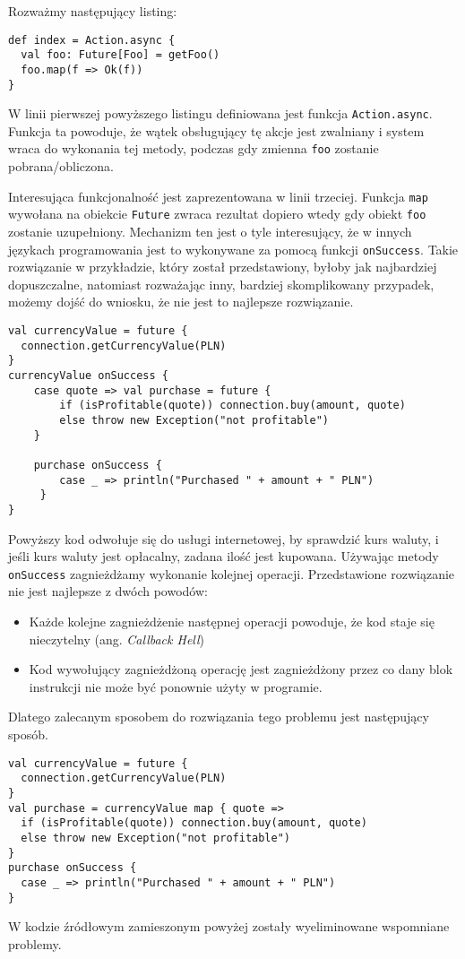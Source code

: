 Rozważmy następujący listing:

\begin{lstlisting}
def index = Action.async {
  val foo: Future[Foo] = getFoo()
  foo.map(f => Ok(f))
}
\end{lstlisting}

\par

W linii pierwszej powyższego listingu definiowana jest funkcja \lstinline{Action.async}. Funkcja ta powoduje, że wątek obsługujący tę akcje jest zwalniany i system wraca do wykonania tej metody, podczas gdy zmienna \lstinline{foo} zostanie pobrana/obliczona.

\par
Interesująca funkcjonalność jest zaprezentowana w linii trzeciej. Funkcja \lstinline{map} wywołana na obiekcie \lstinline{Future} zwraca rezultat dopiero wtedy gdy obiekt \lstinline{foo} zostanie uzupełniony. Mechanizm ten jest o tyle interesujący, że w innych językach programowania jest to wykonywane za pomocą funkcji \lstinline{onSuccess}. Takie rozwiązanie w przykładzie, który został przedstawiony, byłoby jak najbardziej dopuszczalne, natomiast rozważając inny, bardziej skomplikowany przypadek, możemy dojść do wniosku, że nie jest to najlepsze rozwiązanie.

\begin{lstlisting}
val currencyValue = future {
  connection.getCurrencyValue(PLN)
}
currencyValue onSuccess { 
	case quote => val purchase = future {
		if (isProfitable(quote)) connection.buy(amount, quote)
		else throw new Exception("not profitable")
	}
  
	purchase onSuccess {
		case _ => println("Purchased " + amount + " PLN")
	 }
}
\end{lstlisting}

Powyższy kod odwołuje się do usługi internetowej, by sprawdzić kurs waluty, i jeśli kurs waluty jest opłacalny, zadana ilość jest kupowana.
Używając metody \lstinline{onSuccess} zagnieżdżamy wykonanie kolejnej operacji. Przedstawione rozwiązanie nie jest najlepsze z dwóch powodów:
\begin{itemize}
	\item Każde kolejne zagnieżdżenie następnej operacji powoduje, że kod staje się nieczytelny (ang. \emph{Callback Hell})
	\item Kod wywołujący zagnieżdżoną operację jest zagnieżdżony przez co dany blok instrukcji nie może być ponownie użyty w programie.
\end{itemize}

Dlatego zalecanym sposobem do rozwiązania tego problemu jest następujący sposób.

\begin{lstlisting}
val currencyValue = future {
  connection.getCurrencyValue(PLN)
}
val purchase = currencyValue map { quote => 
  if (isProfitable(quote)) connection.buy(amount, quote)
  else throw new Exception("not profitable")
}
purchase onSuccess {
  case _ => println("Purchased " + amount + " PLN")
}
\end{lstlisting}

W kodzie źródłowym zamieszonym powyżej zostały wyeliminowane wspomniane problemy. 
